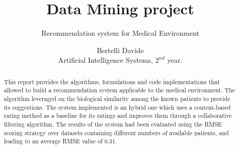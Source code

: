 \documentclass[sigconf,edbt]{acmart-edbt2021}
\begin{document}
\title{Data Mining project}
\subtitle{Recommendation system for Medical Environment}
  

\author{Bertelli Davide\\Artificial Intelligence Systems, $2^{nd}$ year.}



\begin{abstract}
This report provides the algorithms, formulations and code implementations that
allowed to build a recommendation system applicable to the medical environment.
The algorithm leveraged on the biological similarity among the known patients
to provide its suggestions.
The system implemented is an hybrid one which uses a content-based rating
method as a baseline for its ratings and improves them through a collaborative
filtering algorithm.
The results of the system had been evaluated using the RMSE scoring strategy
over datasets containing different numbers of available patients, and leading
to an average RMSE value of 0.31.
\end{abstract}


\maketitle



% 
% 

%
\end{document}
